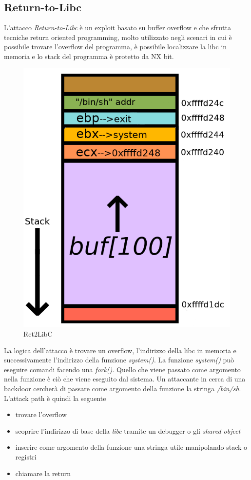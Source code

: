 \subsection*{Return-to-Libc}

L'attacco \textit{Return-to-Libc} è un exploit basato su buffer overflow e che sfrutta tecniche return oriented programming, molto utilizzato negli scenari in cui è possibile trovare l'overflow del programma, è possibile localizzare la libc in memoria e lo stack del programma è protetto da NX bit. \\
\vspace{1cm}
\FloatBarrier
\begin{figure}[!htbp]
    \centering
    \includegraphics[width=0.4\linewidth]{images/ret2libc.png}
    \caption{Ret2LibC}
\end{figure}
\FloatBarrier
\vspace{1cm}
La logica dell'attacco è trovare un overflow, l'indirizzo della libc in memoria e successivamente l'indirizzo della funzione \textit{system()}. La funzione \textit{system()} può eseguire comandi facendo una \textit{fork()}. Quello che viene passato come argomento nella funzione è ciò che viene eseguito dal sistema. Un attaccante in cerca di una backdoor cercherà di passare come argomento della funzione la stringa \textit{/bin/sh}.\\
L'attack path è quindi la seguente
\begin{itemize}
    \item trovare l'overflow
    \item scoprire l'indirizzo di base della \textit{libc} tramite un debugger o gli \textit{shared object}
    \item inserire come argomento della funzione una stringa utile manipolando stack o registri
    \item chiamare la return
\end{itemize} 
